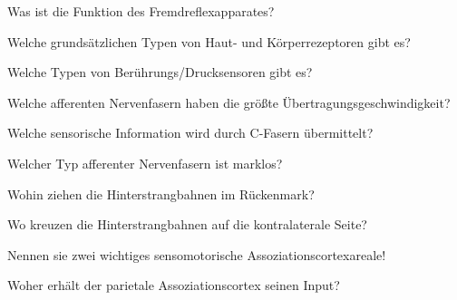 \documentclass[10pt, a4paper]{exam}
\begin{document}
\begin{questions}
\begin{solution}
  \end{solution}

  \question Was ist die Funktion des Fremdreflexapparates?
  \begin{solution}

  \end{solution}

  \question Welche grundsätzlichen Typen von Haut- und Körperrezeptoren gibt es?
  \begin{solution}

  \end{solution}

  \question Welche Typen von Berührungs/Drucksensoren gibt es?
  \begin{solution}

  \end{solution}

  \question Welche afferenten Nervenfasern haben die größte Übertragungsgeschwindigkeit?
  \begin{solution}

  \end{solution}

  \question Welche sensorische Information wird durch C-Fasern übermittelt?
  \begin{solution}

  \end{solution}

  \question Welcher Typ afferenter Nervenfasern ist marklos?
  \begin{solution}

  \end{solution}

  \question Wohin ziehen die Hinterstrangbahnen im Rückenmark?
  \begin{solution}

  \end{solution}

  \question Wo kreuzen die Hinterstrangbahnen auf die kontralaterale Seite?
  \begin{solution}

  \end{solution}

  \question Nennen sie zwei wichtiges sensomotorische Assoziationscortexareale!
  \begin{solution}

  \end{solution}

  \question Woher erhält der parietale Assoziationscortex seinen Input?
  \begin{solution}


\end{solution}
\end{questions}
\end{document}
